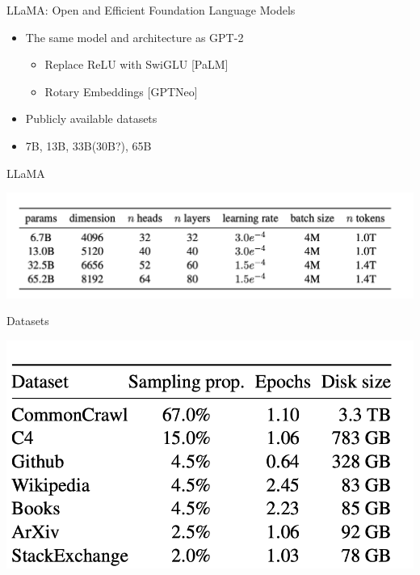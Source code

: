 \documentclass[aspectratio=1610,xcolor={dvipsnames},hyperref={colorlinks,unicode,linkcolor=violet,anchorcolor=BlueViolet,citecolor=YellowOrange,filecolor=black,urlcolor=Aquamarine}]{beamer}
\begin{document}
\begin{frame}[label={sec:org9cd988e}]{LLaMA: Open and Efficient Foundation Language Models }
\begin{itemize}
\item The same model and architecture as GPT-2
\begin{itemize}
\item Replace ReLU with SwiGLU [PaLM] 
\item Rotary Embeddings [GPTNeo] 
\end{itemize}
\item Publicly available datasets
\item 7B, 13B, 33B(30B?), 65B
\end{itemize}
\end{frame}

\begin{frame}[label={sec:orgd5893a6}]{LLaMA}
\begin{center}
\includegraphics[width=.9\linewidth]{./p2.png}
\end{center}
\end{frame}

\begin{frame}[label={sec:org6c7c162}]{Datasets}
\begin{center}
\includegraphics[width=.9\linewidth]{./p3.png}
\end{center}
\end{frame}
\end{document}
